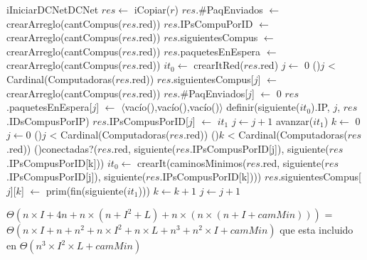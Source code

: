 \begin{Algoritmos}

  \begin{algoritmo}{iIniciarDCNet}{}{DCNet}
    $res \gets$ iCopiar($r$)   
    $res$.\#PaqEnviados $\gets$ crearArreglo(cantCompus($res$.red))   
    $res$.IPsCompuPorID $\gets$ crearArreglo(cantCompus($res$.red))   
    $res$.siguientesCompus $\gets$ crearArreglo(cantCompus($res$.red))   
    $res$.paquetesEnEspera $\gets$ crearArreglo(cantCompus($res$.red))   
     $it_{0} \gets$ crearItRed($res$.red)   
     $j \gets$ 0   
    \While(){$j$ < Cardinal(Computadoras($res$.red))}{
      $res$.siguientesCompus[$j$] $\gets$ crearArreglo(cantCompus($res$.red))   
      $res$.\#PaqEnviados[$j$] $\gets$ 0   
      $res$.paquetesEnEspera[$j$] $\gets$ $\langle$vac\'{i}o(),vac\'{i}o(),vac\'{i}o()$\rangle$   
      definir(siguiente($it_{0}$).IP, $j$, $res$.IDsCompusPorIP)   
      $res$.IPsCompusPorID[$j$] $\gets$ $it_{1}$   
      $j \gets j + 1$   
      avanzar($it_{1}$)   
    }
     $k \gets$ 0   
    $j \gets 0$   
    \While(){$j$ < Cardinal(Computadoras($res$.red))}{
      \While(){$k$ < Cardinal(Computadoras($res$.red))}{
        \If(){conectadas?($res$.red, siguiente($res$.IPsCompusPorID[j]), siguiente($res$.IPsCompusPorID[k]))}{
           $it_{0} \gets$ crearIt(caminosMinimos($res$.red, siguiente($res$.IPsCompusPorID[j]), siguiente($res$.IPsCompusPorID[k])))\;
          $res$.siguientesCompus[$j$][$k$] $\gets$ prim(fin(siguiente($it_{1}$)))   
        }
        $k \gets k + 1$  
      }
      $j \gets j + 1$  
    }
  \end{algoritmo}
 \datosAlgoritmo{} %
  {} %
  {} %
  {$\Theta(n \times I + 4 n + n \times (n + I^2 + L) + n \times (n \times (n + I + camMin)))$ = $\Theta(n \times I + n + n^2+ n \times I^2 + n \times L + n^3 + n^2 \times I + camMin)$ que esta incluido en $\Theta(n^3 \times I^2 \times L + camMin)$} %
  {} %


\end{Algoritmos}
